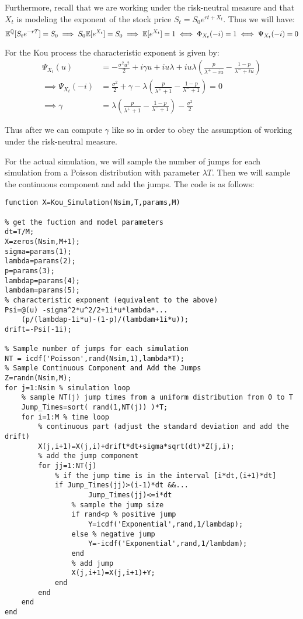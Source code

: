 Furthermore, recall that we are working under the risk-neutral measure and that
$X_t$ is modeling the exponent of the stock price $S_t = S_0e^{rt+X_t}$. Thus
we will have:
\[ \mathbb{E}^{\mathbb{Q}}[S_te^{-rT}] = S_0 \implies S_0 \mathbb{E}[e^{X_t}] = S_0 \implies \mathbb{E}[e^{X_t}]
    = 1 \iff \Phi_{X_t}(-i) = 1 \iff \Psi_{X_t}(-i) = 0 \]

For the Kou process the characteristic exponent is given by:
\begin{align*}
    \Psi_{X_t}(u) &= -\frac{\sigma^2u^2}{2} + i\gamma u + iu\lambda + iu\lambda
    \left( \frac{p}{\lambda^+-iu} - \frac{1-p}{\lambda^-+iu}\right) \\
    \implies \Psi_{X_t}(-i) &= \frac{\sigma^2}{2} + \gamma - \lambda \left(
    \frac{p}{\lambda^++1} - \frac{1-p}{\lambda^-+1}\right) = 0 \\
    \implies \gamma &= \lambda \left( \frac{p}{\lambda^++1} -
    \frac{1-p}{\lambda^-+1}\right) - \frac{\sigma^2}{2}
\end{align*}

Thus after we can compute $\gamma$ like so in order to obey the assumption of
working under the risk-neutral measure.

For the actual simulation, we will sample the number of jumps for each simulation
from a Poisson distribution with parameter $\lambda T$. Then we will sample the
continuous component and add the jumps. The code is as follows:

\begin{verbatim}
function X=Kou_Simulation(Nsim,T,params,M)

% get the fuction and model parameters
dt=T/M;
X=zeros(Nsim,M+1);
sigma=params(1);
lambda=params(2);
p=params(3);
lambdap=params(4);
lambdam=params(5);
% characteristic exponent (equivalent to the above)
Psi=@(u) -sigma^2*u^2/2+1i*u*lambda*...
    (p/(lambdap-1i*u)-(1-p)/(lambdam+1i*u));
drift=-Psi(-1i);

% Sample number of jumps for each simulation
NT = icdf('Poisson',rand(Nsim,1),lambda*T);
% Sample Continuous Component and Add the Jumps
Z=randn(Nsim,M);
for j=1:Nsim % simulation loop
    % sample NT(j) jump times from a uniform distribution from 0 to T
    Jump_Times=sort( rand(1,NT(j)) )*T;
    for i=1:M % time loop
        % continuous part (adjust the standard deviation and add the drift)
        X(j,i+1)=X(j,i)+drift*dt+sigma*sqrt(dt)*Z(j,i);
        % add the jump component
        for jj=1:NT(j) 
            % if the jump time is in the interval [i*dt,(i+1)*dt]
            if Jump_Times(jj)>(i-1)*dt &&...
                    Jump_Times(jj)<=i*dt
                % sample the jump size
                if rand<p % positive jump
                    Y=icdf('Exponential',rand,1/lambdap);
                else % negative jump
                    Y=-icdf('Exponential',rand,1/lambdam);
                end
                % add jump
                X(j,i+1)=X(j,i+1)+Y;
            end
        end
    end
end
\end{verbatim}

